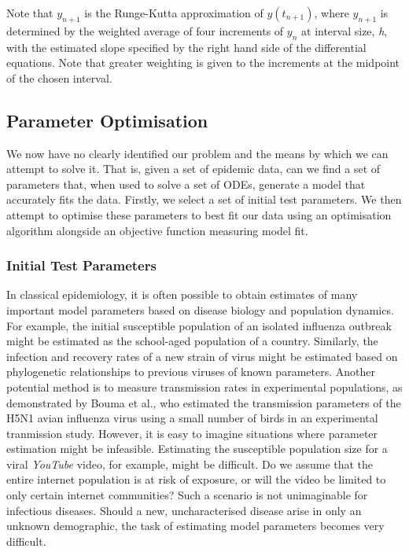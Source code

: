 \documentclass[11pt, a4paper, oneside,titlepage]{article}
\begin{document}
\begin{framed}
Note that $y_{n+1}$ is the Runge-Kutta approximation of $y(t_{n+1})$,
where $y_{n+1}$ is determined by the weighted average of four
increments of $y_n$ at interval size, \emph{h}, with the estimated
slope specified by the right hand side of the differential
equations. Note that greater weighting is given to the increments at
the midpoint of the chosen interval.
\end{framed}

\subsection{Parameter Optimisation}
We now have no clearly identified our problem and the
means by which we can attempt to solve it. That is, given a set of
epidemic data, can we find a set of parameters that, when used to
solve a set of ODEs, generate a model that accurately fits the
data. Firstly, we select a set of initial test parameters. We then
attempt to optimise these parameters to best fit our data using an
optimisation algorithm alongside an objective function measuring model
fit.

\subsubsection{Initial Test Parameters}
In classical epidemiology, it is often possible to obtain estimates of
many important model parameters based on disease biology and
population dynamics. For example, the initial susceptible population
of an isolated influenza outbreak might be estimated as the school-aged
population of a country. Similarly, the infection and recovery rates of a
new strain of virus might be estimated based on phylogenetic relationships
to previous viruses of known parameters.\cite{volz} Another potential method is to measure
transmission rates in experimental populations, as demonstrated by
Bouma et al., who estimated the transmission parameters of the H5N1
avian influenza virus using a small number of birds in an experimental
tranmission study.\cite{bouma} However, it is easy to imagine
situations where parameter estimation might be infeasible. Estimating
the susceptible population size for a viral \emph{YouTube} video, for
example, might be difficult. Do we assume that the entire internet
population is at risk of exposure, or will the video be limited to only
certain internet communities? Such a scenario is not unimaginable for
infectious diseases. Should a new, uncharacterised disease arise in
only an unknown demographic, the task of estimating model parameters
becomes very difficult.
\end{document}
